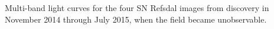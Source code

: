 Multi-band light curves for the four SN Refsdal images from discovery in November 2014 through July 2015, when the field became unobservable. 